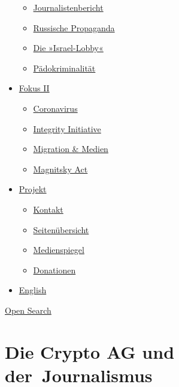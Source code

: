 \begin{itemize}
  \begin{itemize}
  \tightlist
  \item
    \href{https://swprs.org/bericht-eines-journalisten/}{Journalistenbericht}
  \item
    \href{https://swprs.org/russische-propaganda/}{Russische Propaganda}
  \item
    \href{https://swprs.org/die-israel-lobby-fakten-und-mythen/}{Die
    »Israel-Lobby«}
  \item
    \href{https://swprs.org/geopolitik-und-paedokriminalitaet/}{Pädokriminalität}
  \end{itemize}
\item
  \href{https://swprs.org/migration-und-medien/}{Fokus II}

  \begin{itemize}
  \tightlist
  \item
    \href{https://swprs.org/covid-19-hinweis-ii/}{Coronavirus}
  \item
    \href{https://swprs.org/die-integrity-initiative/}{Integrity
    Initiative}
  \item
    \href{https://swprs.org/migration-und-medien/}{Migration \& Medien}
  \item
    \href{https://swprs.org/der-fall-magnitsky/}{Magnitsky Act}
  \end{itemize}
\item
  \href{https://swprs.org/kontakt/}{Projekt}

  \begin{itemize}
  \tightlist
  \item
    \href{https://swprs.org/kontakt/}{Kontakt}
  \item
    \href{https://swprs.org/uebersicht/}{Seitenübersicht}
  \item
    \href{https://swprs.org/medienspiegel/}{Medienspiegel}
  \item
    \href{https://swprs.org/donationen/}{Donationen}
  \end{itemize}
\item
  \href{https://swprs.org/contact/}{English}
\end{itemize}

\protect\hyperlink{}{Open Search}

\hypertarget{die-crypto-ag-und-der-journalismus}{%
\section{Die Crypto AG und
der~Journalismus}\label{die-crypto-ag-und-der-journalismus}}

